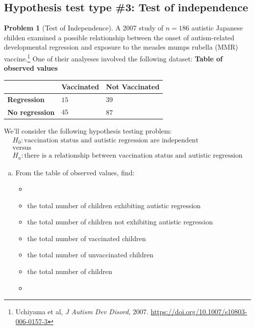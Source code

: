 \documentclass[10pt]{amsart}
\theoremstyle{definition}
\newtheorem{problem}[theorem]{Problem}
\newcommand{\vt}{\vskip 5mm} %
\newcommand{\Fl}{\vt\noindent\textbf} %
\newcommand{\1}[1]{\textbf{1}_{\left[#1\right]}} %
\begin{document}
\subsection{Hypothesis test type \#3: Test of independence}
\begin{problem}[Test of Independence]
  A 2007 study of $n=186$ autistic Japanese childen examined a possible
  relationship between the onset of autism-related developmental regression
  and exposure to the measles mumps rubella (MMR) vaccine.\footnote{Uchiyama
    et al, \textit{J Autism Dev Disord}, 2007.
    \url{https://doi.org/10.1007/s10803-006-0157-3}} One of their analyeses
  involved the following dataset: \Fl{Table of observed values}
  \begin{center}
    \begin{tabular}{l|l|l|}
      & \textbf{Vaccinated} & \textbf{Not Vaccinated} \\ \hline
      \textbf{Regression}    & $15\phantom{\displaystyle\int}$ & $39$ \\ \hline
      \textbf{No regression} & $45\phantom{\displaystyle\int}$ & $87$ \\ \hline
    \end{tabular}
  \end{center}
  \vspace{1em}
  We'll consider the following hypothesis testing problem:
  \begin{gather*}
    H_{0}: \text{vaccination status and autistic regression are independent}\\
    \text{versus}\\
    H_{a}: \text{there is a relationship between vaccination status and autistic regression}
  \end{gather*}
  \begin{enumerate}[(a)]
    \setlength{\itemsep}{1em}
    \item From the table of observed values, find:
    \begin{itemize}
      \item[]
      \item the total number of children exhibiting autistic regression
      \item the total number of children not exhibiting autistic regression
      \item the total number of vaccinated children
      \item the total number of unvaccinated children
      \item the total number of children
      \item[]  

\end{itemize}
\end{enumerate}
\end{problem}
\end{document}
